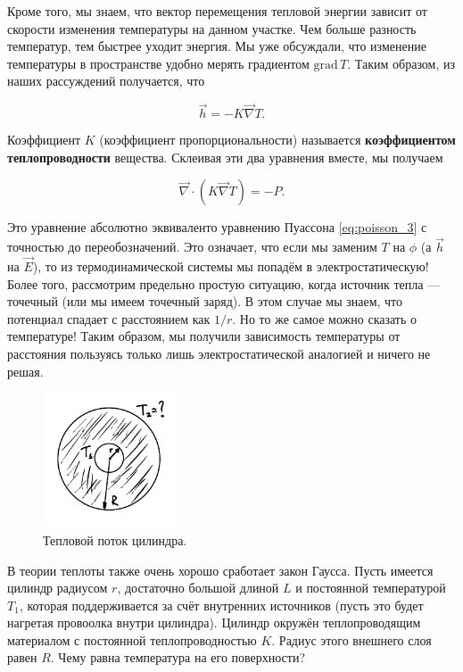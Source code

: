 \documentclass[11pt,a4paper]{article}
\numberwithin{equation}{section}
\newcommand{\grad}{\mathrm{grad}\,}
\newcommand{\vn}{\vec{\nabla}}
\begin{document}
Кроме того, мы знаем, что вектор перемещения тепловой энергии зависит
от скорости изменения температуры на данном участке. Чем больше
разность температур, тем быстрее уходит энергия. Мы уже обсуждали, что
изменение температуры в пространстве удобно мерять градиентом $\grad
T$. Таким образом, из наших рассуждений получается, что 

\begin{equation}
  \label{eq:heat_2}
  \vec{h} = - K \vn T. 
\end{equation}

Коэффициент $K$ (коэффициент пропорциональности) называется
\textbf{коэффициентом теплопроводности} вещества. Склеивая эти два
уравнения вместе, мы получаем 

\begin{equation}
  \label{eq:heat_3}
  \vn \cdot (K \vn T) = -P.
\end{equation}

Это уравнение абсолютно эквиваленто уравнению Пуассона
\eqref{eq:poisson_3} с точностью до переобозначений. Это означает, что
если мы заменим $T$ на $\phi$ (а $\vec{h}$ на $\vec{E}$), то из
термодинамической системы мы попадём в электростатическую! Более того,
рассмотрим предельно простую ситуацию, когда источник тепла ---
точечный (или мы имеем точечный заряд). В этом случае мы знаем, что
потенциал спадает с расстоянием как $1/r$. Но то же самое можно
сказать о температуре! Таким образом, мы получили зависимость
температуры от расстояния пользуясь только лишь электростатической
аналогией и ничего не решая.


\begin{figure}
  \vspace{-1.2cm}
  \begin{center}
    \includegraphics[width=4cm,height=4cm]{heat.pdf}
  \end{center}
  \vspace{-0.7cm}
  \caption{Тепловой поток цилиндра.}
  \label{fig:heat}
\end{figure}


В теории теплоты также очень хорошо сработает закон Гаусса. Пусть
имеется цилиндр радиусом $r$, достаточно большой длиной $L$ и
постоянной температурой $T_1$, которая поддерживается за счёт
внутренних источников (пусть это будет нагретая провоолка внутри
цилиндра). Цилиндр окружён теплопроводящим материалом с постоянной
теплопроводностью $K$. Радиус этого внешнего слоя равен $R$. Чему
равна температура на его поверхности?
\end{document}
